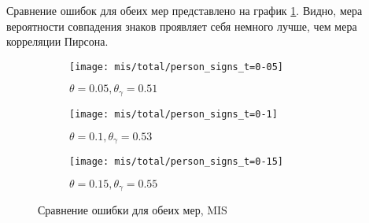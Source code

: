 Сравнение ошибок для обеих мер представлено на график \ref{fig:exp/mis/pearson_signs}. Видно, мера вероятности совпадения знаков проявляет себя немного лучше, чем мера корреляции Пирсона.

\begin{figure}[H]
     \centering
     \begin{subfigure}[b]{0.49\textwidth}
         \centering
         \texttt{[image: mis/total/person\_signs\_t=0-05]}
         \caption{$\theta=0.05, \theta_\gamma=0.51$}
     \end{subfigure}
     \hfill
     \begin{subfigure}[b]{0.49\textwidth}
         \centering
         \texttt{[image: mis/total/person\_signs\_t=0-1]}
         \caption{$\theta=0.1, \theta_\gamma=0.53$}
     \end{subfigure}
     \vfill
     \begin{subfigure}[b]{0.49\textwidth}
         \centering
         \texttt{[image: mis/total/person\_signs\_t=0-15]}
         \caption{$\theta=0.15, \theta_\gamma=0.55$}
     \end{subfigure}

    
        \caption{Сравнение ошибки для обеих мер,  MIS}
        \label{fig:exp/mis/pearson_signs}
\end{figure}  



